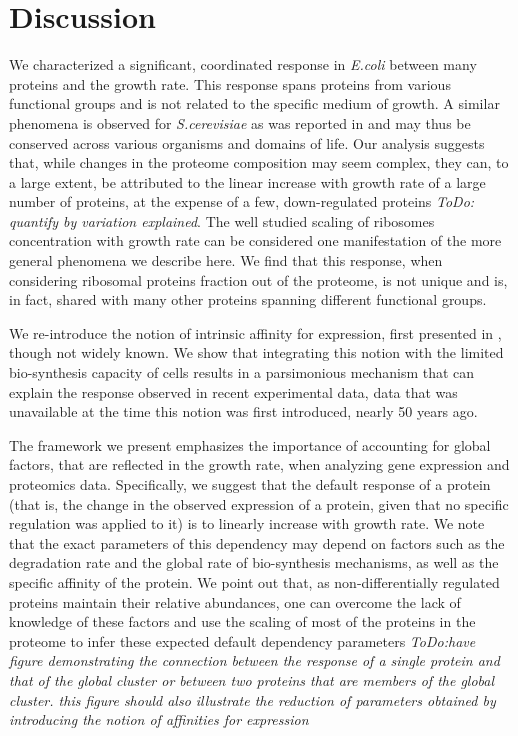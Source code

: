 \documentclass[notitlepage]{article}
\begin{document}
\section{Discussion}
We characterized a significant, coordinated response in \emph{E.coli} between many proteins and the growth rate.
This response spans proteins from various functional groups and is not related to the specific medium of growth.
A similar phenomena is observed for \emph{S.cerevisiae} as was reported in \cite{Keren2013a} and may thus be conserved across various organisms and domains of life.
Our analysis suggests that, while changes in the proteome composition may seem complex, they can, to a large extent, be attributed to the linear increase with growth rate of a large number of proteins, at the expense of a few, down-regulated proteins \emph{ToDo: quantify by variation explained}.
The well studied scaling of ribosomes concentration with growth rate can be considered one manifestation of the more general phenomena we describe here.
We find that this response, when considering ribosomal proteins fraction out of the proteome, is not unique and is, in fact, shared with many other proteins spanning different functional groups.

We re-introduce the notion of intrinsic affinity for expression, first presented in \cite{Maaloe1969}, though not widely known.
We show that integrating this notion with the limited bio-synthesis capacity of cells results in a parsimonious mechanism that can explain the response observed in recent experimental data, data that was unavailable at the time this notion was first introduced, nearly 50 years ago.

The framework we present emphasizes the importance of accounting for global factors, that are reflected in the growth rate, when analyzing gene expression and proteomics data.
Specifically, we suggest that the default response of a protein (that is, the change in the observed expression of a protein, given that no specific regulation was applied to it) is to linearly increase with growth rate.
We note that the exact parameters of this dependency may depend on factors such as the degradation rate and the global rate of bio-synthesis mechanisms, as well as the specific affinity of the protein.
We point out that, as non-differentially regulated proteins maintain their relative abundances, one can overcome the lack of knowledge of these factors and use the scaling of most of the proteins in the proteome to infer these expected default dependency parameters \emph{ToDo:have figure demonstrating the connection between the response of a single protein and that of the global cluster or between two proteins that are members of the global cluster. this figure should also illustrate the reduction of parameters obtained by introducing the notion of affinities for expression}
\end{document}
